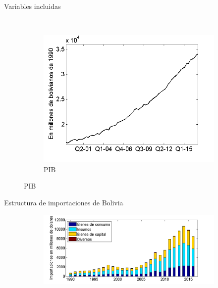 \documentclass[12pt]{beamer}
\begin{document}
\begin{frame}{Variables incluidas}
\begin{figure}
    ~ %
    \begin{subfigure}[b]{0.3\textwidth}
        \includegraphics[width=\textwidth]{4pib}
        \caption{\tiny PIB}
        \label{4pib}
    \end{subfigure}
\end{figure}
\end{frame}

\begin{frame}{Estructura de importaciones de Bolivia}
\begin{figure}
\centering
    \begin{subfigure}[b]{\textwidth}
        \includegraphics[width=\textwidth]{imp9016}
        \label{mestr}
    \end{subfigure}
\end{figure}
\end{frame}
\end{document}
